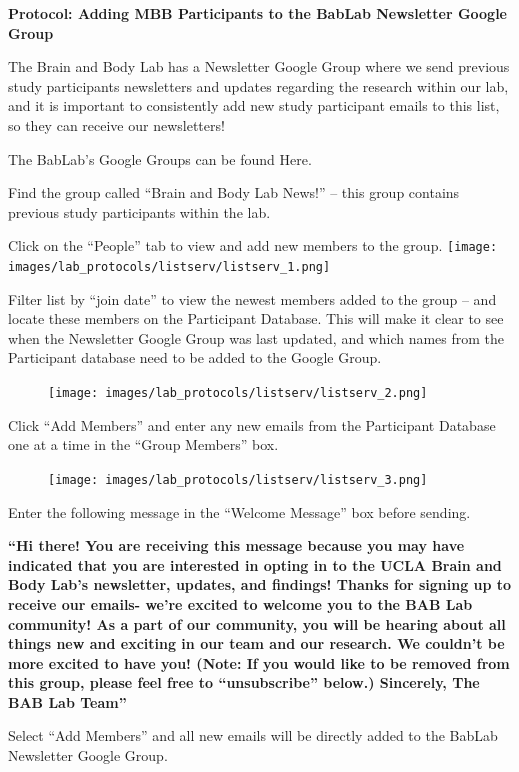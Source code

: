 \documentclass[
]{book}
\begin{document}
\textbf{Protocol: Adding MBB Participants to the BabLab Newsletter Google Group}

The Brain and Body Lab has a Newsletter Google Group where we send previous study participants newsletters and updates regarding the research within our lab, and it is important to consistently add new study participant emails to this list, so they can receive our newsletters!

The BabLab's Google Groups can be found Here.

Find the group called ``Brain and Body Lab News!'' -- this group contains previous study participants within the lab.

Click on the ``People'' tab to view and add new members to the group.
\texttt{[image: images/lab\_protocols/listserv/listserv\_1.png]}

Filter list by ``join date'' to view the newest members added to the group -- and locate these members on the Participant Database. This will make it clear to see when the Newsletter Google Group was last updated, and which names from the Participant database need to be added to the Google Group.

\begin{figure}
\centering
\texttt{[image: images/lab\_protocols/listserv/listserv\_2.png]}
\caption{}
\end{figure}

Click ``Add Members'' and enter any new emails from the Participant Database one at a time in the ``Group Members'' box.

\begin{figure}
\centering
\texttt{[image: images/lab\_protocols/listserv/listserv\_3.png]}
\caption{}
\end{figure}

Enter the following message in the ``Welcome Message'' box before sending.

\textbf{``Hi there!
You are receiving this message because you may have indicated that you are interested in opting in to the UCLA Brain and Body Lab's newsletter, updates, and findings! Thanks for signing up to receive our emails- we're excited to welcome you to the BAB Lab community! As a part of our community, you will be hearing about all things new and exciting in our team and our research. We couldn't be more excited to have you! (Note: If you would like to be removed from this group, please feel free to ``unsubscribe'' below.)
Sincerely,
The BAB Lab Team''}

Select ``Add Members'' and all new emails will be directly added to the BabLab Newsletter Google Group.
\end{document}
